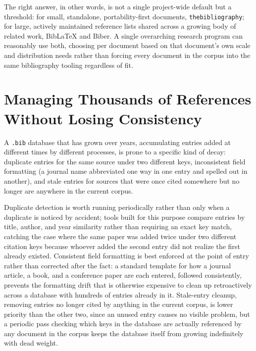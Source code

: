 The right answer, in other words, is not a single project-wide default but a threshold: for small, standalone, portability-first documents, \texttt{thebibliography}; for large, actively maintained reference lists shared across a growing body of related work, BibLaTeX and Biber. A single overarching research program can reasonably use both, choosing per document based on that document's own scale and distribution needs rather than forcing every document in the corpus into the same bibliography tooling regardless of fit.

\hypertarget{managing-thousands-of-references-without-losing-consistency}{%
\section{Managing Thousands of References Without Losing Consistency}\label{managing-thousands-of-references-without-losing-consistency}}

A \texttt{.bib} database that has grown over years, accumulating entries added at different times by different processes, is prone to a specific kind of decay: duplicate entries for the same source under two different keys, inconsistent field formatting (a journal name abbreviated one way in one entry and spelled out in another), and stale entries for sources that were once cited somewhere but no longer are anywhere in the current corpus.

Duplicate detection is worth running periodically rather than only when a duplicate is noticed by accident; tools built for this purpose compare entries by title, author, and year similarity rather than requiring an exact key match, catching the case where the same paper was added twice under two different citation keys because whoever added the second entry did not realize the first already existed. Consistent field formatting is best enforced at the point of entry rather than corrected after the fact: a standard template for how a journal article, a book, and a conference paper are each entered, followed consistently, prevents the formatting drift that is otherwise expensive to clean up retroactively across a database with hundreds of entries already in it. Stale-entry cleanup, removing entries no longer cited by anything in the current corpus, is lower priority than the other two, since an unused entry causes no visible problem, but a periodic pass checking which keys in the database are actually referenced by any document in the corpus keeps the database itself from growing indefinitely with dead weight.

